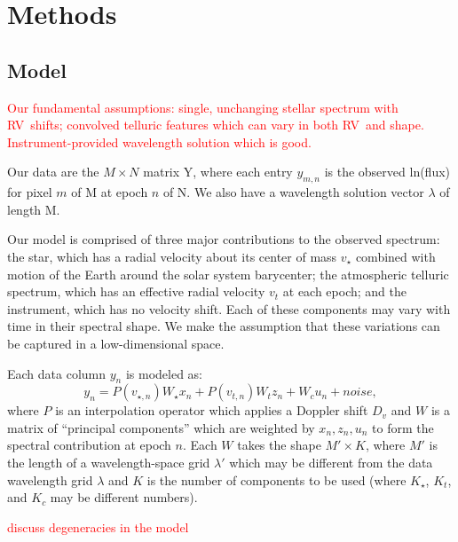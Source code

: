 \documentclass[twocolumn]{aastex62}
\newcommand{\todo}[1]{\textcolor{red}{#1}}  %
\newcommand{\acronym}[1]{{\small{#1}}}
\newcommand{\RV}{\acronym{RV}}
\begin{document}
\section{Methods}
\label{s:methods}
\subsection{Model}

\todo{Our fundamental assumptions: single, unchanging stellar spectrum with \RV\ shifts; convolved telluric features which can vary in both \RV\ and shape. Instrument-provided wavelength solution which is good.}

Our data are the $M \times N$ matrix Y, where each entry $y_{m,n}$ is the observed ln(flux) for pixel $m$ of M at epoch $n$ of N. We also have a wavelength solution vector $\lambda$ of length M.

Our model is comprised of three major contributions to the observed spectrum: the star, which has a radial velocity about its center of mass $v_{\star}$ combined with motion of the Earth around the solar system barycenter; the atmospheric telluric spectrum, which has an effective radial velocity $v_t$ at each epoch; and the instrument, which has no velocity shift. Each of these components may vary with time in their spectral shape. 
We make the assumption that these variations can be captured in a low-dimensional space.

Each data column $y_n$ is modeled as:
$$y_n = P(v_{\star, n}) W_{\star} x_n + P(v_{t, n}) W_{t} z_n + W_{c} u_n + noise,$$
where $P$ is an interpolation operator which applies a Doppler shift $D_v$ and $W$ is a matrix of ``principal components'' which are weighted by $x_n, z_n, u_n$ to form the spectral contribution at epoch $n$. Each $W$ takes the shape $M' \times K$, where $M'$ is the length of a wavelength-space grid $\lambda'$ which may be different from the data wavelength grid $\lambda$ and $K$ is the number of components to be used (where $K_{\star}$, $K_t$, and $K_c$ may be different numbers).

\todo{discuss degeneracies in the model}
\end{document}
